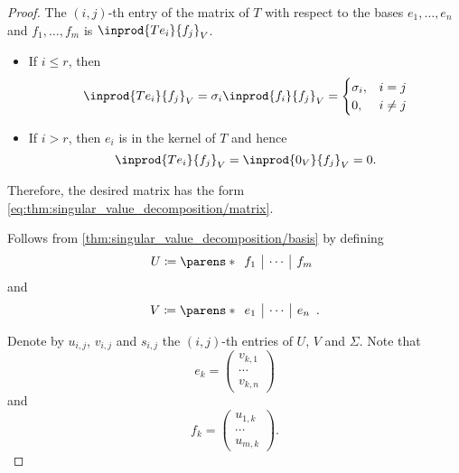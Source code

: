 \begin{proof}
  The \( (i, j) \)-th entry of the matrix of \( T \) with respect to the bases \( e_1, \ldots, e_n \) and \( f_1, \ldots, f_m \) is \( \inprod { T e_i } { f_j }_V \).
  \begin{itemize}
    \item If \( i \leq r \), then
    \begin{equation*}
      \inprod { T e_i } { f_j }_V
      =
      \sigma_i \inprod { f_i } { f_j }_V
      =
      \begin{cases}
        \sigma_i, &i = j \\
        0,        &i \neq j \\
      \end{cases}
    \end{equation*}

    \item If \( i > r \), then \( e_i \) is in the kernel of \( T \) and hence
    \begin{equation*}
      \inprod { T e_i } { f_j }_V
      =
      \inprod { 0_V } { f_j }_V
      =
      0.
    \end{equation*}
  \end{itemize}

  Therefore, the desired matrix has the form \eqref{eq:thm:singular_value_decomposition/matrix}.

   Follows from \cref{thm:singular_value_decomposition/basis} by defining
  \begin{equation*}
    U \coloneqq \parens*
    {
      \begin{array}{c|c|c}
        f_1 & \cdots & f_m
      \end{array}
    }
  \end{equation*}
  and
  \begin{equation*}
    V \coloneqq \parens*
    {
      \begin{array}{c|c|c}
        e_1 & \cdots & e_n
      \end{array}
    }.
  \end{equation*}

  Denote by \( u_{i,j} \), \( v_{i,j} \) and \( s_{i,j} \) the \( (i, j) \)-th entries of \( U \), \( V \) and \( \Sigma \). Note that
  \begin{equation*}
    e_k = \begin{pmatrix} v_{k,1} \\ \cdots \\ v_{k,n} \end{pmatrix}
  \end{equation*}
  and
  \begin{equation*}
    f_k = \begin{pmatrix} u_{1,k} \\ \cdots \\ u_{m,k} \end{pmatrix}.
  \end{equation*}


\end{proof}
